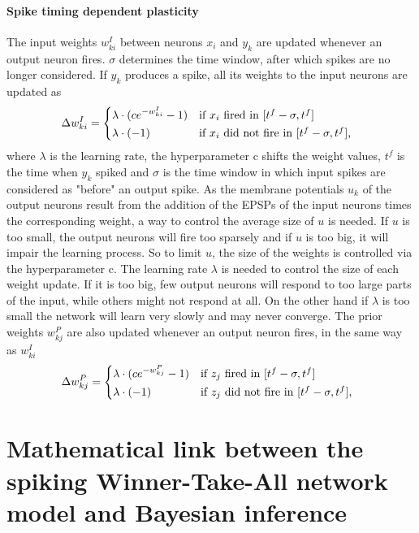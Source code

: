 \paragraph{Spike timing dependent plasticity}
The input weights $w^{I}_{ki}$ between neurons $x_i$ and $y_k$ are updated whenever an output neuron fires. $\sigma$ determines the time window, after which spikes are no longer considered. If $y_k$ produces a spike, all its weights to the input neurons are updated as
\begin{equation}
\label{deltawki}
\Delta w^{I}_{ki} = \begin{dcases*} \lambda \cdot (ce^{-w^{I}_{ki}} - 1) & if $x_{i}$ fired in $ [t^f - \sigma, t^f] $ \\
\lambda \cdot (-1) & \text{if $ x_i $ did not fire in $ [t^f - \sigma, t^f] $, } \end{dcases*}
\end{equation}
where $\lambda$ is the learning rate, the hyperparameter c shifts the weight values, $t^f$ is the time when $y_k$ spiked and $\sigma$ is the time window in which input spikes are considered as "before" an output spike. As the membrane potentials $u_k$ of the output neurons result from the addition of the EPSPs of the input neurons times the corresponding weight, a way to control the average size of $u$ is needed. If $u$ is too small, the output neurons will fire too sparsely and if $u$ is too big, it will impair the learning process. So to limit $u$, the size of the weights is controlled via the hyperparameter c. The learning rate $\lambda$ is needed to control the size of each weight update. If it is too big, few output neurons will respond to too large parts of the input, while others might not respond at all. On the other hand if $\lambda$ is too small the network will learn very slowly and may never converge.
The prior weights $w^{P}_{kj}$ are also updated whenever an output neuron fires, in the same way as $w^{I}_{ki}$
\begin{equation}
\label{deltawkj}
\Delta w^{P}_{kj} = \begin{dcases*} \lambda \cdot (ce^{-w^{P}_{kj}} - 1) & if $z_{j}$ fired in $ [t^f - \sigma, t^f] $ \\
\lambda \cdot (-1) & \text{if $ z_j $ did not fire in $ [t^f - \sigma, t^f] $, } \end{dcases*}
\end{equation}

\section{Mathematical link between the spiking Winner-Take-All network model and Bayesian inference}
\label{linkNetworkBayes}

